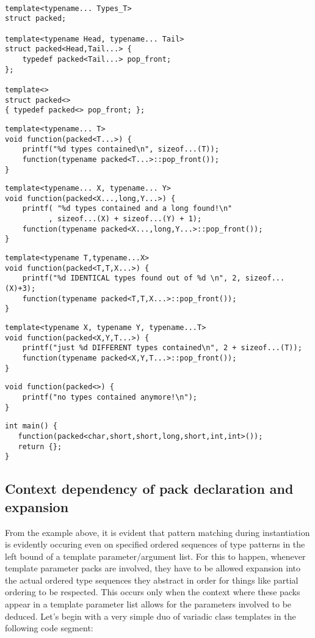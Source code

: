 \documentclass[ notitlepage
              , a4paper
              , twoside ]{article}
\newcommand{\parnum}{\bfseries\arabic{parcount}}
\newcounter{parcount}
\newcommand\p{%
    \stepcounter{parcount}%
    \leavevmode\marginpar[\hfill\parnum]{\parnum}%
}
\begin{document}
\begin{verbatim}

template<typename... Types_T>
struct packed;

template<typename Head, typename... Tail>
struct packed<Head,Tail...> {
    typedef packed<Tail...> pop_front;
};

template<>
struct packed<>
{ typedef packed<> pop_front; };
\end{verbatim}
\begin{verbatim}
template<typename... T>
void function(packed<T...>) {
    printf("%d types contained\n", sizeof...(T));
    function(typename packed<T...>::pop_front());
}
\end{verbatim}
\begin{verbatim}
template<typename... X, typename... Y>
void function(packed<X...,long,Y...>) {
    printf( "%d types contained and a long found!\n"
          , sizeof...(X) + sizeof...(Y) + 1);
    function(typename packed<X...,long,Y...>::pop_front());
}
\end{verbatim}
\begin{verbatim}
template<typename T,typename...X>
void function(packed<T,T,X...>) {
    printf("%d IDENTICAL types found out of %d \n", 2, sizeof...(X)+3);
    function(typename packed<T,T,X...>::pop_front());
}
\end{verbatim}
\begin{verbatim}
template<typename X, typename Y, typename...T>
void function(packed<X,Y,T...>) {
    printf("just %d DIFFERENT types contained\n", 2 + sizeof...(T));
    function(typename packed<X,Y,T...>::pop_front());
}
\end{verbatim}
\begin{verbatim}
void function(packed<>) {
    printf("no types contained anymore!\n");
}
\end{verbatim}
\begin{verbatim}
int main() {
   function(packed<char,short,short,long,short,int,int>());
   return {};
}

\end{verbatim}

\subsection{Context dependency of pack declaration and expansion}

\p From the example above, it is evident that pattern matching during
instantiation is evidently occuring even on specified
ordered sequences of type patterns in the left bound of a template parameter/argument
list. For this to happen, whenever template
parameter packs are involved, they have to be allowed expansion into the actual
ordered type sequences they abstract in order for things like partial
ordering to be respected. This occurs only when the context where
these packs appear in a template parameter list allows for the parameters
involved to be deduced. Let's begin with a very simple duo of variadic class
templates in the following code segment:
\end{document}
